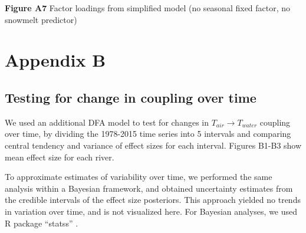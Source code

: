 \documentclass[notitlepage]{article}
\begin{document}
\begin{center}
\end{center}
\textbf{Figure A7} Factor loadings from simplified model (no seasonal fixed factor, no snowmelt predictor)

\clearpage

\section*{Appendix B}

\subsection*{Testing for change in coupling over time}

We used an additional DFA model to test for changes in $T_{air}\rightarrow T_{water}$ coupling over time, by dividing the 1978-2015 time series into 5 intervals and comparing central tendency and variance of effect sizes for each interval. Figures B1-B3 show mean effect size for each river.

To approximate estimates of variability over time, we performed the same analysis within a Bayesian framework, and obtained uncertainty estimates from the credible intervals of the effect size posteriors. This approach yielded no trends in variation over time, and is not visualized here. For Bayesian analyses, we used R package ``statss'' \citep{eric_ward_2017_375646}.
\end{document}
